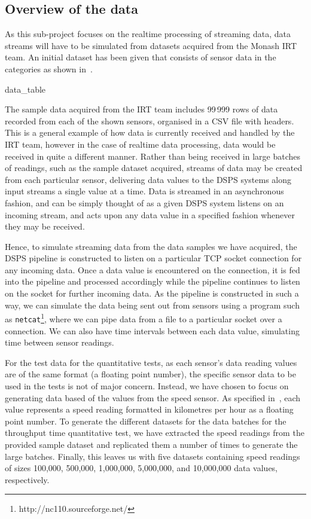 


\subsection{Overview of the data} %
\label{sub:overview_of_the_data}

As this sub-project focuses on the realtime processing of streaming data, data streams will have to be simulated from
datasets acquired from the Monash IRT team. An initial dataset has been given that consists of sensor data in the
categories as shown in~.

{data_table}

The sample data acquired from the IRT team includes 99\,999 rows of data recorded from each of the shown sensors,
organised in a CSV file with headers. This is a general example of how data is currently received and handled by the IRT
team, however in the case of realtime data processing, data would be received in quite a different manner. Rather than
being received in large batches of readings, such as the sample dataset acquired, streams of data may be created from
each particular sensor, delivering data values to the DSPS systems along input streams a single value at a time. Data
is streamed in an asynchronous fashion, and can be simply thought of as a given DSPS system listens on an incoming stream, and
acts upon any data value in a specified fashion whenever they may be received.

Hence, to simulate streaming data from the data samples we have acquired, the DSPS pipeline is constructed to listen on
a particular TCP socket connection for any incoming data. Once a data value is encountered on the connection, it is fed into
the pipeline and processed accordingly while the pipeline continues to listen on the socket for further incoming data.
As the pipeline is constructed in such a way, we can simulate the data being sent out from sensors using a program such
as \texttt{netcat}\footnote{http://nc110.sourceforge.net/}, where we can pipe data from a file to a particular
socket over a connection. We can also have time intervals between each data value, simulating time between sensor readings.

For the test data for the quantitative tests, as each sensor's data reading values are of the same format (a floating point
number), the specific sensor data to be used in the tests is not of major concern. Instead, we have chosen to focus on
generating data based of the values from the speed sensor. As specified in~, each value represents
a speed reading formatted in kilometres per hour as a floating point number. To generate the different datasets for the
data batches for the throughput time quantitative test, we have extracted the speed readings from the provided sample dataset
and replicated them a number of times to generate the large batches. Finally, this leaves us with five datasets containing
speed readings of sizes 100,\@000, 500,\@000, 1,\@000,\@000, 5,\@000,\@000, and 10,\@000,\@000 data values, respectively.

